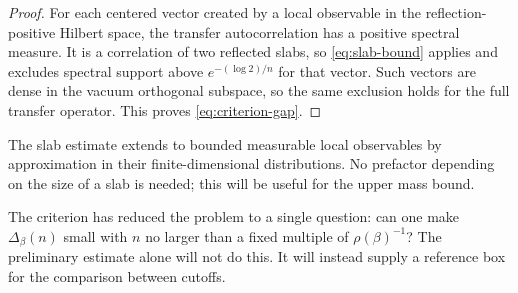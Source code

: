 \begin{proof}
For each centered vector created by a local observable in the
reflection-positive Hilbert space, the transfer autocorrelation has a
positive spectral measure. It is a correlation of two reflected slabs,
so \eqref{eq:slab-bound} applies and excludes spectral support above
\(e^{-(\log2)/n}\) for that vector. Such vectors are dense in the vacuum
orthogonal subspace, so the same exclusion holds for the full transfer
operator. This proves \eqref{eq:criterion-gap}.
\end{proof}

The slab estimate extends to bounded measurable local observables by
approximation in their finite-dimensional distributions. No prefactor
depending on the size of a slab is needed; this will be useful for the
upper mass bound.

The criterion has reduced the problem to a single question: can one make
\(\Delta_\beta(n)\) small with \(n\) no larger than a fixed multiple of
\(\rho(\beta)^{-1}\)? The preliminary estimate alone will not do this.
It will instead supply a reference box for the comparison between cutoffs.


